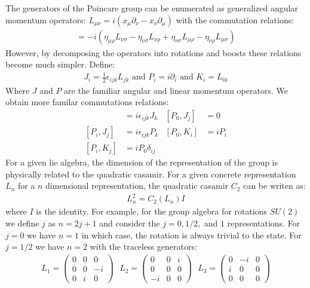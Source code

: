The generators of the Poincare group can be enumerated as generalized angular momentum operators:
$L_{\mu\nu} = i(x_\mu \partial_\nu - x_\nu \partial_\mu)$ with the commutation relations:
\begin{align*}
[L_{\mu\nu}, L_{\rho\sigma}] = -i(\eta_{\mu\rho} L_{\nu \sigma}  - \eta_{\nu \sigma} L_{\nu \rho} + 
\eta_{\nu \sigma} L_{\mu \rho} - \eta_{\nu \rho} L_{\mu \sigma})
\end{align*}
However, by decomposing the operators into rotations and boosts these relations become much simpler. Define:
\begin{align*}
J_i = \frac{1}{2}\epsilon_{ijk} L_{jk} \text{  and   } P_i = i\partial_i \text{  and   } K_i = L_{0i}
\end{align*}
Where $J$ and $P$ are the familiar angular and linear momentum operators. 
We obtain more familar commutations relations:
\begin{align*}
[J_i, J_j] &= i \epsilon_{ijk}J_k  & [P_0,J_j] &= 0 \\
[P_i,J_j] &= i \epsilon_{ijk} P_k & [P_0, K_i] &= i P_i \\
[P_i,K_j] &= i P_0 \delta_{ij} & 
\end{align*}
For a given lie algebra, the dimension of the representation of the group is physically related to the 
 quadratic casamir. For a given concrete representation $L_n$ for a $n$ dimensional
representation, the quadratic casamir $C_2$ can be writen as:
\begin{align*}
L_n^2 = C_2(L_n)I
\end{align*}
where $I$ is the identity. For example, for the group algebra for rotations 
$SU(2)$ we define $j$ as $n=2j+1$
and consider the $j=0,1/2,$ and $1$ representations. For $j=0$ we have $n=1$ 
 in which case, the rotation is always
trivial to the state. For $j=1/2$ we have $n=2$ with the traceless generators:
\begin{align*}
L_1 = \begin{pmatrix} 0 & 0 & 0 \\ 0 & 0 & -i \\ 0 & i & 0 \end{pmatrix} \text{   } L_2 = \begin{pmatrix} 0 & 0 & i \\ 0 & 0 & 0 \\ -i & 0 & 0 \end{pmatrix} \text{   } L_3 = \begin{pmatrix} 0 & -i & 0 \\ i & 0 & 0 \\ 0 & 0 & 0 \end{pmatrix}
\end{align*}
